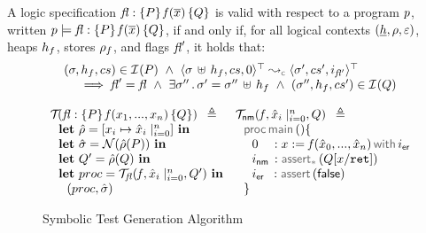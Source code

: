 \begin{definition}
A \jsil logic specification ${\mathit{fl}} : \{ P \} \, \mathit{f}(\overline{x}) \, \{ Q \}$ is valid with respect to a program 
$p$, written $p \models {\ensuremath{\mathit{fl}}} : \{ P \} \, \mathit{f}(\overline{x}) \, \{ Q \}$, if and only if, for all logical 
contexts $(\underline{h}, \rho, \varepsilon)$, heaps $h_f$, stores $\rho_f$, and flags $\mathit{fl}'$, it holds that: 
$$
\begin{array}{l}
   (\jstate, \heap_f, \cs) \in \interpret{}{}(P) 
   \ \wedge \ 
    \abssemrule{\jstate \dunion \heap_f, \cs, 0}{\jstate', \cs', i_{\flag'}}{\top}{\top}{\concrete} \\ \quad \
   \implies
      \flag' = \flag \ \wedge \ \exists \jstate'' \, . \, \jstate' = \jstate'' \dunion \heap_f
          \ \wedge \   (\jstate'', \heap_f, \cs') \in \interpret{}{}(Q) 
\end{array}
$$
\end{definition}

\begin{figure}
{\small
$$
\begin{array}{lll}
\testify{}(\specsig{P}{\pid(\jvar_1, ..., \jvar_n)}{Q}{\flag}) \ \semeq                           &  \testify{\fnormal}(\pid, \svar_i\mid_{i=0}^n, Q) \ \semeq \\
%
\ \  \mathbf{let} \ \sstore =  [ \jvar_i \mapsto \svar_i \mid_{i=0}^n] \ \mathbf{in}        &  \ \  \darkmath{\sf proc} \jsilmain () \{    \\
%
 \ \  \mathbf{let} \ \sstate = \normaliser(\sstore(P)) \ \mathbf{in}                               &   \ \ \ \ 0_{\phantom{\sf nm}}: \jsilcall{\jvar}{\pid}{\svar_0, ..., \svar_n}{\errlab} \\
\ \  \mathbf{let} \ Q' = \sstore(Q) \ \mathbf{in}                                                           &    \ \ \ \ \retlab \, : \sepassert(Q[\jvar/\retvar])  \\
 \ \  \mathbf{let} \ \proc = \testify{\flag}(\pid, \svar_i\mid_{i=0}^n, Q')  \ \mathbf{in}  &    \ \ \ \ \errlab \, \, \, : \jassert(\jfalse)   \\
 \ \ \ \ (\proc, \sstate)                                                                                                 &    \ \ \}  
\end{array}
$$}
\vspace*{-0.2cm}
\caption{Symbolic Test Generation Algorithm~\label{fig:test:generation}}
\vspace*{-0.2cm}
\end{figure}

